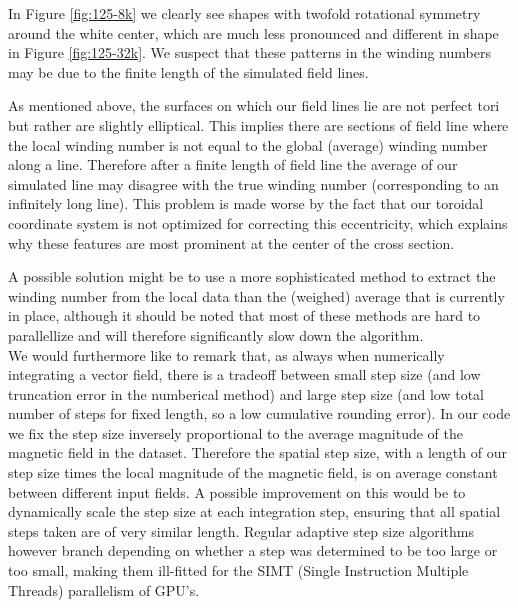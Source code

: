 \documentclass[a4paper]{article}
\begin{document}
In Figure \ref{fig:125-8k} we clearly see shapes with twofold rotational symmetry around the white center, which are much less pronounced and different in shape in Figure \ref{fig:125-32k}.
We suspect that these patterns in the winding numbers may be due to the finite length of the simulated field lines. 

As mentioned above, the surfaces on which our field lines lie are not perfect tori but rather are slightly elliptical. This implies there are sections of field line where the local winding number is not equal to the global (average) winding number along a line. 
Therefore after a finite length of field line the average of our simulated line may disagree with the true winding number (corresponding to an infinitely long line). 
This problem is made worse by the fact that our toroidal coordinate system is not optimized for correcting this eccentricity, which explains why these features are most prominent at the center of the cross section. 

A possible solution might be to use a more sophisticated method to extract the winding number from the local data than the (weighed) average that is currently in place, although it should be noted that most of these methods are hard to parallellize and will therefore significantly slow down the algorithm.\\

We would furthermore like to remark that, as always when numerically integrating a vector field, there is a tradeoff between small step size (and low truncation error in the numberical method) and large step size (and low total number of steps for fixed length, so a low cumulative rounding error). 
In our code we fix the step size inversely proportional to the average magnitude of the magnetic field in the dataset. 
Therefore the spatial step size, with a length of our step size times the local magnitude of the magnetic field, is on average constant between different input fields. 
A possible improvement on this would be to dynamically scale the step size at each integration step, ensuring that all spatial steps taken are of very similar length. Regular adaptive step size algorithms however branch depending on whether a step was determined to be too large or too small, making them ill-fitted for the SIMT (Single Instruction Multiple Threads) parallelism of GPU's.\\
\end{document}
